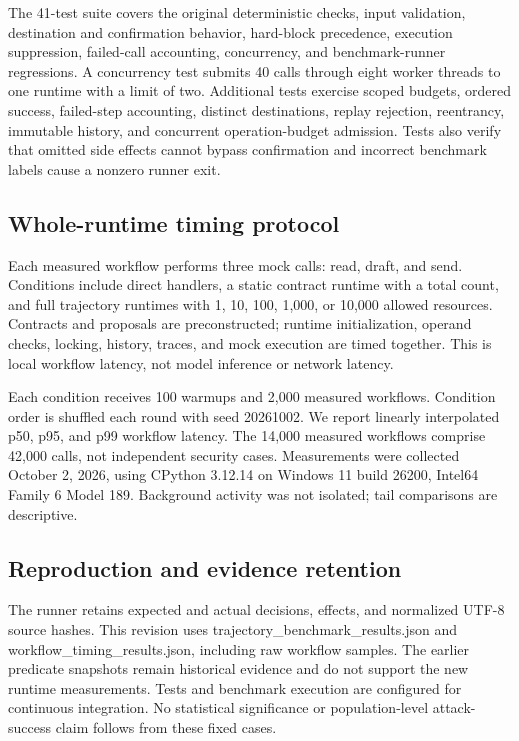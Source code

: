 \documentclass[conference,letterpaper]{IEEEtran}
\begin{document}
The 41-test suite covers the original deterministic checks, input validation, destination and confirmation behavior, hard-block precedence, execution suppression, failed-call accounting, concurrency, and benchmark-runner regressions. A concurrency test submits 40 calls through eight worker threads to one runtime with a limit of two. Additional tests exercise scoped budgets, ordered success, failed-step accounting, distinct destinations, replay rejection, reentrancy, immutable history, and concurrent operation-budget admission. Tests also verify that omitted side effects cannot bypass confirmation and incorrect benchmark labels cause a nonzero runner exit.


\subsection{Whole-runtime timing protocol}

Each measured workflow performs three mock calls: read, draft, and send. Conditions include direct handlers, a static contract runtime with a total count, and full trajectory runtimes with 1, 10, 100, 1,000, or 10,000 allowed resources. Contracts and proposals are preconstructed; runtime initialization, operand checks, locking, history, traces, and mock execution are timed together. This is local workflow latency, not model inference or network latency.


Each condition receives 100 warmups and 2,000 measured workflows. Condition order is shuffled each round with seed 20261002. We report linearly interpolated p50, p95, and p99 workflow latency. The 14,000 measured workflows comprise 42,000 calls, not independent security cases. Measurements were collected October 2, 2026, using CPython 3.12.14 on Windows 11 build 26200, Intel64 Family 6 Model 189. Background activity was not isolated; tail comparisons are descriptive.


\subsection{Reproduction and evidence retention}

The runner retains expected and actual decisions, effects, and normalized UTF-8 source hashes. This revision uses trajectory\_benchmark\_results.json and workflow\_timing\_results.json, including raw workflow samples. The earlier predicate snapshots remain historical evidence and do not support the new runtime measurements. Tests and benchmark execution are configured for continuous integration. No statistical significance or population-level attack-success claim follows from these fixed cases.
\end{document}
